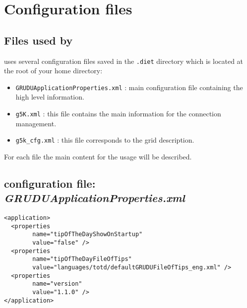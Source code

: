 \appendix
\chapter{Configuration files}

\section{Files used by \grudu}

\grudu uses several configuration files saved in the \texttt{.diet}
directory which is located at the root of your home directory:

\begin{itemize}
  \item \texttt{GRUDUApplicationProperties.xml} : main configuration file containing
  the high level information.
  \item \texttt{g5K.xml} : this file contains the main information for the
  \gfk connection management.
  \item \texttt{g5k\_cfg.xml} : this file corresponds to the grid description.
\end{itemize}

For each file the main content for the \grudu usage will be described.

\section{\gfk configuration file: \textit{GRUDUApplicationProperties.xml}}
\begin{verbatim}
<application>
  <properties 
        name="tipOfTheDayShowOnStartup" 
        value="false" />
  <properties 
        name="tipOfTheDayFileOfTips" 
        value="languages/totd/defaultGRUDUFileOfTips_eng.xml" />
  <properties 
        name="version" 
        value="1.1.0" />
</application>
\end{verbatim}

